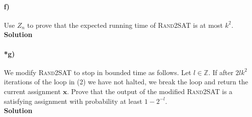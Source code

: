 \documentclass[10pt]{article}
\begin{document}
\paragraph{f)} Use $Z_n$ to prove that the expected running time of \textsc{Rand2SAT} is at most $k^2$.\\
\textbf{Solution}\\

\paragraph{*g)} We modify \textsc{Rand2SAT} to stop in bounded time as follows. Let $l\in\mathbb{Z}$. If after $2lk^2$ iterations of the loop in (2) we have not halted, we break the loop and return the current assignment $\textbf{x}$. Prove that the output of the modified \textsc{Rand2SAT} is a satisfying assignment with probability at least $1-2^{-l}$.\\ %
\textbf{Solution}\\
\end{document}
